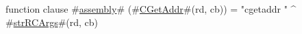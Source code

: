 function clause #\hyperref[sailMIPSzassembly]{assembly}# (#\hyperref[sailMIPSzCGetAddr]{CGetAddr}#(rd, cb)) = "cgetaddr " ^ #\hyperref[sailMIPSzstrRCArgs]{strRCArgs}#(rd, cb)
